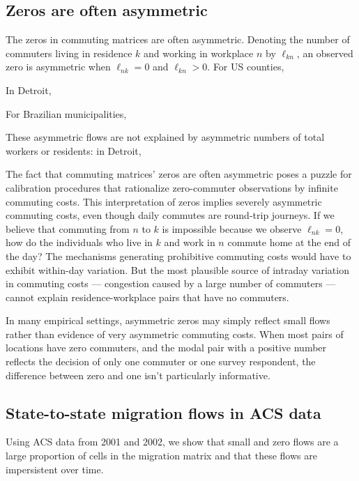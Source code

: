 \documentclass[11pt]{article}
\theoremstyle{definition}
\begin{document}
\subsection{Zeros are often asymmetric} \label{sec:asym_zeros}

The zeros in commuting matrices are often asymmetric.
Denoting the number of commuters living in residence $k$ and working in workplace $n$ by $\ell_{kn}$,
an observed zero is asymmetric when $\ell_{nk} = 0$ and $\ell_{kn}>0$.
For US counties,

In Detroit,

For Brazilian municipalities,

These asymmetric flows are not explained by asymmetric numbers of total workers or residents:
in Detroit,


The fact that commuting matrices' zeros are often asymmetric 
poses a puzzle for calibration procedures that rationalize zero-commuter observations by infinite commuting costs.
This interpretation of zeros implies severely asymmetric commuting costs,
even though daily commutes are round-trip journeys.
If we believe that commuting from $n$ to $k$ is impossible because we observe $\ell_{nk}=0$,
how do the individuals who live in $k$ and work in $n$ commute home at the end of the day?
The mechanisms generating prohibitive commuting costs would have to exhibit within-day variation.
But the most plausible source of intraday variation in commuting costs --- congestion caused by a large number of commuters --- cannot explain residence-workplace pairs that have no commuters.

In many empirical settings, asymmetric zeros may simply reflect small flows rather than evidence of very asymmetric commuting costs.
When most pairs of locations have zero commuters, and the modal pair with a positive number reflects the decision of only one commuter or one survey respondent,
the difference between zero and one isn't particularly informative.

\subsection{State-to-state migration flows in ACS data}\label{sec:appendix:empirics:ACSmigration}

Using ACS data from 2001 and 2002, we show that small and zero flows are a large proportion of cells in the migration matrix
and that these flows are impersistent over time.

\end{document}
